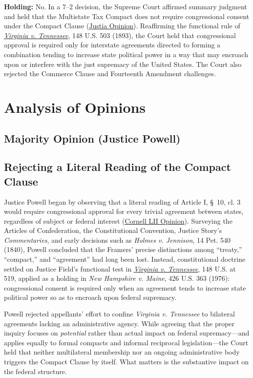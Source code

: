 \documentclass[12pt]{article}
\begin{document}
\textbf{Holding:} No. In a 7--2 decision, the Supreme Court affirmed summary judgment and held that the Multistate Tax Compact does not require congressional consent under the Compact Clause (\href{https://supreme.justia.com/cases/federal/us/434/452/}{Justia Opinion}). Reaffirming the functional rule of \href{https://supreme.justia.com/cases/federal/us/148/503/}{\textit{Virginia v. Tennessee}}, 148 U.S. 503 (1893), the Court held that congressional approval is required only for interstate agreements directed to forming a combination tending to increase state political power in a way that may encroach upon or interfere with the just supremacy of the United States. The Court also rejected the Commerce Clause and Fourteenth Amendment challenges.

\section{Analysis of Opinions}
\subsection{Majority Opinion (Justice Powell)}

\subsection{Rejecting a Literal Reading of the Compact Clause}
Justice Powell began by observing that a literal reading of Article I, \S\ 10, cl. 3 would require congressional approval for every trivial agreement between states, regardless of subject or federal interest (\href{https://www.law.cornell.edu/supremecourt/text/434/452}{Cornell LII Opinion}). Surveying the Articles of Confederation, the Constitutional Convention, Justice Story's \textit{Commentaries}, and early decisions such as \textit{Holmes v. Jennison}, 14 Pet. 540 (1840), Powell concluded that the Framers' precise distinctions among ``treaty,'' ``compact,'' and ``agreement'' had long been lost. Instead, constitutional doctrine settled on Justice Field's functional test in \href{https://supreme.justia.com/cases/federal/us/148/503/}{\textit{Virginia v. Tennessee}}, 148 U.S. at 519, applied as a holding in \textit{New Hampshire v. Maine}, 426 U.S. 363 (1976): congressional consent is required only when an agreement tends to increase state political power so as to encroach upon federal supremacy.

Powell rejected appellants' effort to confine \textit{Virginia v. Tennessee} to bilateral agreements lacking an administrative agency. While agreeing that the proper inquiry focuses on \textit{potential} rather than actual impact on federal supremacy---and applies equally to formal compacts and informal reciprocal legislation---the Court held that neither multilateral membership nor an ongoing administrative body triggers the Compact Clause by itself. What matters is the substantive impact on the federal structure.
\end{document}
